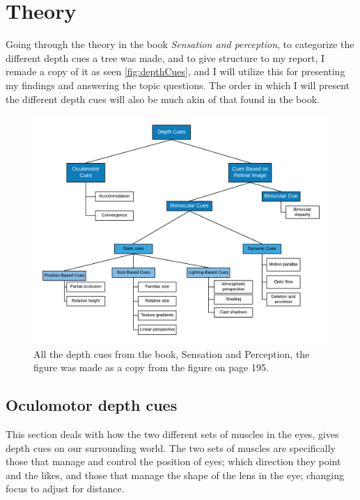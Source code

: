 \section{Theory}
	Going through the theory in the book \textit{Sensation and perception}, to categorize the different depth cues a tree was made, and to give structure to my report, I remade a copy of it as seen \autoref{fig:depthCues}, and I will utilize this for presenting my findings and answering the topic questions. The order in which I will present the different depth cues will also be much akin of that found in the book.
	\begin{figure}[H]
		\centering
		\includegraphics[width=1\linewidth]{figure/depthcues}
		\caption{All the depth cues from the book, Sensation and Perception\citep{sensationPerception}, the figure was made as a copy from the figure on page 195.}
		\label{fig:depthCues}
	\end{figure}
	\subsection{Oculomotor depth cues}
		This section deals with how the two different sets of muscles in the eyes, gives depth cues on our surrounding world. The two sets of muscles are specifically those that manage and control the position of eyes; which direction they point and the likes, and those that manage the shape of the lens in the eye; changing focus to adjust for distance.
